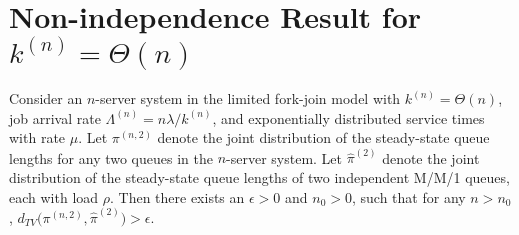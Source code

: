 \documentclass[sigconf]{acmart}
\newcommand{\supn}{^{(n)}}
\begin{document}
%

%

\appendix
\section{Non-independence Result for $k\supn=\Theta(n)$}\label{app:non-independence}
\begin{theorem}\label{thm:non-independence}
Consider an $n$-server system in the limited fork-join model with $k\supn=\Theta(n)$, job arrival rate $\Lambda\supn=n\lambda/k\supn$, and exponentially distributed service times with rate $\mu$. Let $\pi^{(n,2)}$ denote the joint distribution of the steady-state queue lengths for any two queues in the $n$-server system.  Let $\hat{\pi}^{(2)}$ denote the joint distribution of the steady-state queue lengths of two independent M/M/1 queues, each with load $\rho$.  Then there exists an $\epsilon>0$ and $n_0>0$, such that for any $n>n_0$, $d_{TV}\bigl(\pi^{(n,2)}, \hat{\pi}^{(2)}\bigr)>\epsilon$.
\end{theorem}
\end{document}
